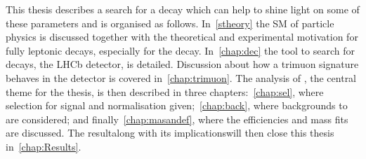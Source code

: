 This thesis describes a search for a decay which can help to shine light on some of these parameters and is organised as follows. In~\autoref{stheory} the \gls{SM} of particle physics is discussed together with the theoretical and experimental motivation for fully leptonic decays, especially for the \Bmumumu decay. In~\autoref{chap:dec} the tool to search for \Bmumumu decays, the LHCb detector, is detailed. Discussion about how a trimuon signature behaves in the detector is covered in~\autoref{chap:trimuon}. The analysis of \Bmumumu, the central theme for the thesis, is then described in three chapters:~\autoref{chap:sel}, where \DIFaddbegin {}\DIFaddend selection for signal and normalisation \DIFdelbegin {}\DIFdelend \DIFaddbegin {}\DIFaddend given;~\autoref{chap:back}, where backgrounds to \DIFdelbegin {}\DIFdelend \Bmumumu are considered; and finally~\autoref{chap:masandef}, where the efficiencies and mass fits are discussed. The result\DIFaddbegin \DIFadd{, }\DIFaddend along with its implications\DIFaddbegin \DIFadd{, }\DIFaddend will then close this thesis in~\autoref{chap:Results}.

